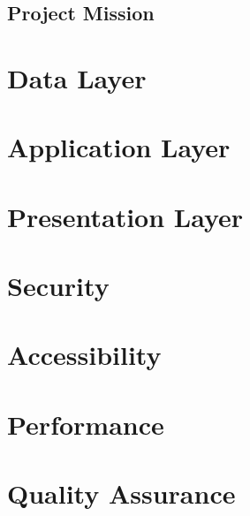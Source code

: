 \documentclass[12pt]{report}
\begin{document}
\section{Project Mission} \label{se:project-mission}


\chapter{Data Layer} \label{ch:data-layer}


\chapter{Application Layer} \label{ch:application-layer}


\chapter{Presentation Layer} \label{ch:presentation-layer}


\chapter{Security} \label{ch:security}


\chapter{Accessibility} \label{ch:accessibility}


\chapter{Performance} \label{ch:performance}


\chapter{Quality Assurance} \label{ch:quality-assurance}
\end{document}
